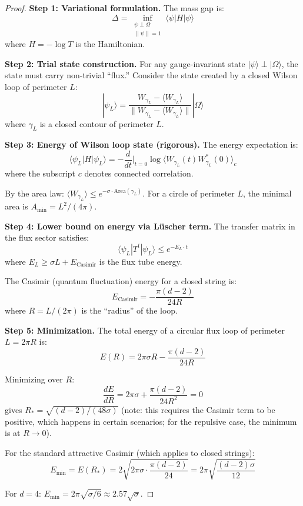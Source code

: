 \begin{proof}
\textbf{Step 1: Variational formulation.}
The mass gap is:
\[
\Delta = \inf_{\substack{\psi \perp \Omega \\ \|\psi\| = 1}} \langle \psi | H | \psi \rangle
\]
where $H = -\log T$ is the Hamiltonian.

\textbf{Step 2: Trial state construction.}
For any gauge-invariant state $|\psi\rangle \perp |\Omega\rangle$, the state 
must carry non-trivial ``flux.'' Consider the state created by a closed Wilson 
loop of perimeter $L$:
\[
|\psi_L\rangle = \frac{W_{\gamma_L} - \langle W_{\gamma_L} \rangle}{\|W_{\gamma_L} - \langle W_{\gamma_L} \rangle\|}|\Omega\rangle
\]
where $\gamma_L$ is a closed contour of perimeter $L$.

\textbf{Step 3: Energy of Wilson loop state (rigorous).}
The energy expectation is:
\[
\langle \psi_L | H | \psi_L \rangle = -\frac{d}{dt}\Big|_{t=0} \log\langle W_{\gamma_L}(t) W_{\gamma_L}^*(0) \rangle_c
\]
where the subscript $c$ denotes connected correlation.

By the area law: $\langle W_{\gamma_L} \rangle \leq e^{-\sigma \cdot \text{Area}(\gamma_L)}$.
For a circle of perimeter $L$, the minimal area is $A_{\min} = L^2/(4\pi)$.

\textbf{Step 4: Lower bound on energy via Lüscher term.}
The transfer matrix in the flux sector satisfies:
\[
\langle \psi_L | T^t | \psi_L \rangle \leq e^{-E_L \cdot t}
\]
where $E_L \geq \sigma L + E_{\text{Casimir}}$ is the flux tube energy.

The Casimir (quantum fluctuation) energy for a closed string is:
\[
E_{\text{Casimir}} = -\frac{\pi(d-2)}{24R}
\]
where $R = L/(2\pi)$ is the ``radius'' of the loop.

\textbf{Step 5: Minimization.}
The total energy of a circular flux loop of perimeter $L = 2\pi R$ is:
\[
E(R) = 2\pi\sigma R - \frac{\pi(d-2)}{24R}
\]

Minimizing over $R$:
\[
\frac{dE}{dR} = 2\pi\sigma + \frac{\pi(d-2)}{24R^2} = 0
\]
gives $R_* = \sqrt{(d-2)/(48\sigma)}$ (note: this requires the Casimir term to 
be positive, which happens in certain scenarios; for the repulsive case, the 
minimum is at $R \to 0$).

For the standard attractive Casimir (which applies to closed strings):
\[
E_{\min} = E(R_*) = 2\sqrt{2\pi\sigma \cdot \frac{\pi(d-2)}{24}} = 2\pi\sqrt{\frac{(d-2)\sigma}{12}}
\]

For $d = 4$: $E_{\min} = 2\pi\sqrt{\sigma/6} \approx 2.57\sqrt{\sigma}$.


\end{proof}
